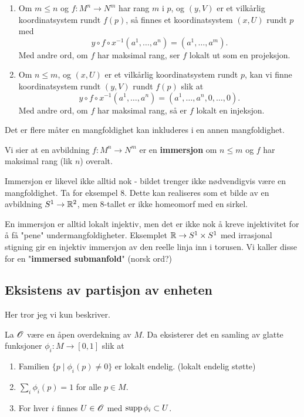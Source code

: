 \documentclass[11pt, english]{article}
\begin{document}
\begin{prop}
\begin{enumerate}
\item Om $m \leq n$ og $f:M^n \to N^m$ har rang $m$ i $p$, og $(y,V)$ er et vilkårlig koordinatsystem rundt $f(p)$, så finnes et koordinatsystem $(x,U)$ rundt $p$ med
$$
y \circ f \circ x^{-1}(a^1, \ldots, a^n) = (a^1, \ldots, a^m).
$$
Med andre ord, om $f$ har maksimal rang, ser $f$ lokalt ut som en projeksjon.
\item Om $n \leq m$, og $(x,U)$ er et vilkårlig koordinatsystem rundt $p$, kan vi finne koordinatsystem rundt $(y,V)$ rundt $f(p)$ slik at
$$
y \circ f \circ x^{-1}(a^1,\ldots, a^n ) = (a^1, \ldots, a^n, 0,\ldots,0).
$$
Med andre ord, om $f$ har maksimal rang, så er $f$ lokalt en injeksjon.
\end{enumerate}
\end{prop}

Det er flere måter en mangfoldighet kan inkluderes i en annen mangfoldighet. 

Vi sier at en avbildning $f:M^n \to N^m $ er en \textbf{immersjon} om $n \leq m$ og $f$ har maksimal rang (lik $n$) overalt.

Immersjon er likevel ikke alltid nok - bildet trenger ikke nødvendigvis være en mangfoldighet. Ta for eksempel $8$. Dette kan realiseres som et bilde av en avbildning $S^1 \to \mathbb{R}^2$, men $8$-tallet er ikke homeomorf med en sirkel. 

En immersjon er alltid lokalt injektiv, men det er ikke nok å kreve injektivitet for å få "pene" undermangfoldigheter. Eksemplet $\mathbb{R} \to S^1 \times S^1$ med irrasjonal stigning gir en injektiv immersjon av den reelle linja inn i torusen. Vi kaller disse for en "\textbf{immersed submanfold}" (norsk ord?) 

\subsection{Eksistens av partisjon av enheten}

Her tror jeg vi kun beskriver.

La $\operatorname{\mathscr{O}}$ være en åpen overdekning av $M$. Da eksisterer det en samling av glatte funksjoner $\phi_i:M \to [0,1]$ slik at
\begin{enumerate}
\item Familien $\{ p \mid \phi_i(p) \neq 0 \}$ er lokalt endelig. (lokalt endelig støtte)
\item $\sum_i \phi_i(p) = 1$ for alle $p \in M$.
\item For hver $i$ finnes $U \in \operatorname{\mathscr{O}}$ med $\operatorname{supp} \phi_i \subset U$.
\end{enumerate}
\end{document}
